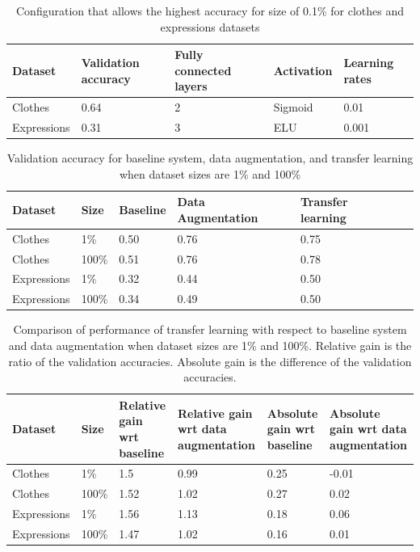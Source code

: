 \documentclass{article}
\begin{document}
\begin{table}[!htb]
  \centering
  \begin{tabular}{| l | l | l | l | l |}
    \hline
    \textbf{Dataset} & \textbf{Validation accuracy} & \textbf{Fully connected layers}& \textbf{Activation} & \textbf{Learning rates}\\ \hline
    Clothes & 0.64 & 2 & Sigmoid & 0.01 \\ \hline
    Expressions & 0.31  & 3 & ELU & 0.001 \\ \hline
  \end{tabular}
  \caption{Configuration that allows the highest accuracy for size of 0.1\% for clothes and expressions datasets}
  \label{tab:tf_1}
\end{table}

\begin{table}[!htb]
  \centering
  \begin{tabular}{| l | l | l | l | l | l |}
    \hline
    \textbf{Dataset} & \textbf{Size} & \textbf{Baseline} & \textbf{Data Augmentation}& \textbf{Transfer learning} \\ \hline
    Clothes & 1\% & 0.50 & 0.76 & 0.75 \\ \hline
    Clothes & 100\% & 0.51 & 0.76 & 0.78 \\ \hline
    Expressions & 1\% & 0.32  & 0.44 & 0.50 \\ \hline
    Expressions & 100\% & 0.34  & 0.49 & 0.50 \\ \hline
  \end{tabular}
  \caption{Validation accuracy for baseline system, data augmentation, and transfer learning when dataset sizes are 1\% and 100\%}
  \label{tab:tf_2}
\end{table}

\begin{table}[!htb]
  \centering
  \begin{tabular}{| l | l | l | l | l | l |}
    \hline
    \textbf{Dataset} & \textbf{Size} & \textbf{Relative gain wrt baseline} & \textbf{Relative gain wrt data augmentation} & \textbf{Absolute gain wrt baseline} & \textbf{Absolute gain wrt data augmentation}\\ \hline
    Clothes & 1\% & 1.5 & 0.99 & 0.25 & -0.01 \\ \hline
    Clothes & 100\% & 1.52 & 1.02 & 0.27 & 0.02 \\ \hline
    Expressions & 1\% & 1.56  & 1.13 & 0.18 & 0.06 \\ \hline
    Expressions & 100\% & 1.47 & 1.02 & 0.16 & 0.01 \\ \hline
  \end{tabular}
  \caption{Comparison of performance of transfer learning with respect to baseline system and data augmentation when dataset sizes are 1\% and 100\%. Relative gain is the ratio of the validation accuracies. Absolute gain is the difference of the validation accuracies.}
  \label{tab:tf_3}
\end{table}
\end{document}

